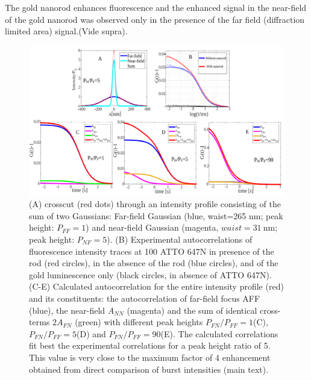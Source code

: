 The gold nanorod enhances fluorescence and the enhanced signal in the near-field of the gold nanorod was observed only in the presence of the far field (diffraction limited area) signal.(Vide supra).
\begin{figure}%
  \centering
  \includegraphics[width=\textwidth]{calc_enhc_corr}
  \makeatletter
  \renewcommand{\fnum@figure}{\figurename~S\thefigure}
  \makeatother{}
  \caption{(A) crosscut (red dots) through an intensity profile consisting of the sum of two Gaussians: Far-field Gaussian (blue, waist=265 nm; peak height: $P_{FF}=1$) and near-field Gaussian (magenta, $waist=\SI{31}{\nm}$; peak height: $P_{NF}=5$).
  (B) Experimental autocorrelations of fluorescence intensity traces at \SI{100}{\nM} ATTO 647N in presence of the rod (red circles), in the absence of the rod (blue circles), and of the gold luminescence only (black circles, in absence of ATTO 647N).
  (C-E) Calculated autocorrelation for the entire intensity profile (red) and its constituents: the autocorrelation of far-field focus AFF (blue), the near-field $A_{NN}$ (magenta) and the 
  sum of identical cross-terms $2A_{FN}$ (green) with different peak heights $P_{FN}/P_{FF}=1$(C), $P_{FN}/P_{FF}=5$(D) and $P_{FN}/P_{FF}=90$(E).
  The calculated correlations fit best the experimental correlations for a peak height ratio of 5.
  This value is very close to the maximum factor of 4 enhancement obtained from direct comparison of burst intensities (main text).}
  \label{SIfig:calc_enhc_corr}
\end{figure}


